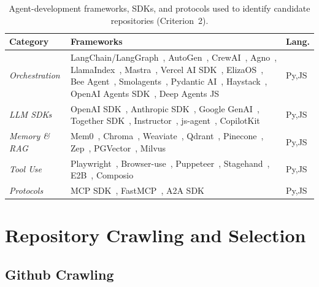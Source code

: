 \begin{table}[t]
\centering
\renewcommand{\arraystretch}{1.1}
\setlength{\tabcolsep}{3pt}
\scriptsize
\caption{Agent-development frameworks, SDKs, and protocols used to identify
candidate repositories (Criterion~2).}
\label{tab:frameworks}
\begin{tabular}{@{}>{\raggedright\arraybackslash}p{}
                  >{\raggedright\arraybackslash}p{}
                  >{\raggedright\arraybackslash}p{}@{}}
\toprule
\textbf{Category} & \textbf{Frameworks} & \textbf{Lang.} \\
\midrule
\emph{Orchestration} & 
  LangChain/LangGraph~\cite{langchain,langgraph}, AutoGen~\cite{autogen}, CrewAI~\cite{crewai},
  Agno~\cite{agno}, LlamaIndex~\cite{llamaindex}, Mastra~\cite{mastra},
  Vercel AI SDK~\cite{vercel-ai}, ElizaOS~\cite{elizaos}, Bee Agent~\cite{beeai},
  Smolagents~\cite{smolagents}, Pydantic AI~\cite{pydantic-ai}, Haystack~\cite{haystack},
  OpenAI Agents SDK~\cite{openai-agents}, Deep Agents JS~\cite{deepagents-js} &
  Py,JS \\
\emph{LLM SDKs} & 
  OpenAI SDK~\cite{openai-sdk}, Anthropic SDK~\cite{anthropic-sdk}, Google GenAI~\cite{google-genai},
  Together SDK~\cite{together-sdk}, Instructor~\cite{instructor},
  js-agent~\cite{js-agent}, CopilotKit~\cite{copilotkit} &
  Py,JS \\
\emph{Memory \& RAG} & 
  Mem0~\cite{mem0}, Chroma~\cite{chroma}, Weaviate~\cite{weaviate}, Qdrant~\cite{qdrant},
  Pinecone~\cite{pinecone}, Zep~\cite{zep}, PGVector~\cite{pgvector}, Milvus~\cite{milvus} &
  Py,JS \\
\emph{Tool Use} & 
  Playwright~\cite{playwright}, Browser-use~\cite{browser-use}, Puppeteer~\cite{puppeteer},
  Stagehand~\cite{stagehand}, E2B~\cite{e2b}, Composio~\cite{composio} &
  Py,JS \\
\emph{Protocols} & 
  MCP SDK~\cite{mcp-sdk}, FastMCP~\cite{fastmcp}, A2A SDK~\cite{a2a} &
  Py,JS \\
\bottomrule
\end{tabular}
\end{table}

\section{Repository Crawling and Selection}
\label{sec:crawling}
\subsection{Github Crawling}

